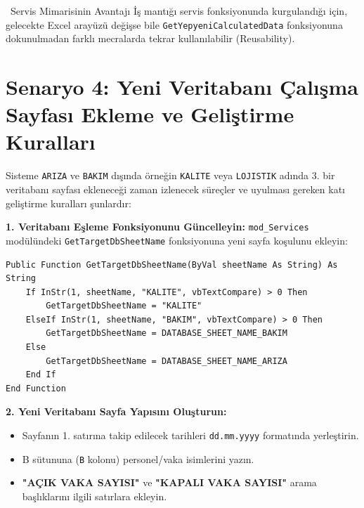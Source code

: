 \vspace{0.3cm}

\begin{infobox}{\faSitemap\ Servis Mimarisinin Avantajı}
İş mantığı servis fonksiyonunda kurgulandığı için, gelecekte Excel arayüzü değişse bile \texttt{GetYepyeniCalculatedData} fonksiyonuna dokunulmadan farklı mecralarda tekrar kullanılabilir (Reusability).
\end{infobox}

\newpage

\section{Senaryo 4: Yeni Veritabanı Çalışma Sayfası Ekleme ve Geliştirme Kuralları}

Sisteme \texttt{ARIZA} ve \texttt{BAKIM} dışında örneğin \texttt{KALITE} veya \texttt{LOJISTIK} adında 3. bir veritabanı sayfası ekleneceği zaman izlenecek süreçler ve uyulması gereken katı geliştirme kuralları şunlardır:

\vspace{0.3cm}

\textbf{\textcolor{primary}{1. Veritabanı Eşleme Fonksiyonunu Güncelleyin:}}
\texttt{mod\_Services} modülündeki \texttt{GetTargetDbSheetName} fonksiyonuna yeni sayfa koşulunu ekleyin:
\begin{lstlisting}[caption={Hedef Veritabanı Eşleme Güncellemesi}]
Public Function GetTargetDbSheetName(ByVal sheetName As String) As String
    If InStr(1, sheetName, "KALITE", vbTextCompare) > 0 Then
        GetTargetDbSheetName = "KALITE"
    ElseIf InStr(1, sheetName, "BAKIM", vbTextCompare) > 0 Then
        GetTargetDbSheetName = DATABASE_SHEET_NAME_BAKIM
    Else
        GetTargetDbSheetName = DATABASE_SHEET_NAME_ARIZA
    End If
End Function
\end{lstlisting}

\vspace{0.2cm}

\textbf{\textcolor{primary}{2. Yeni Veritabanı Sayfa Yapısını Oluşturun:}}
\begin{itemize}\setlength{\itemsep}{2pt}
    \item Sayfanın 1. satırına takip edilecek tarihleri \texttt{dd.mm.yyyy} formatında yerleştirin.
    \item B sütununa (\texttt{B} kolonu) personel/vaka isimlerini yazın.
    \item \textbf{"AÇIK VAKA SAYISI"} ve \textbf{"KAPALI VAKA SAYISI"} arama başlıklarını ilgili satırlara ekleyin.
\end{itemize}

